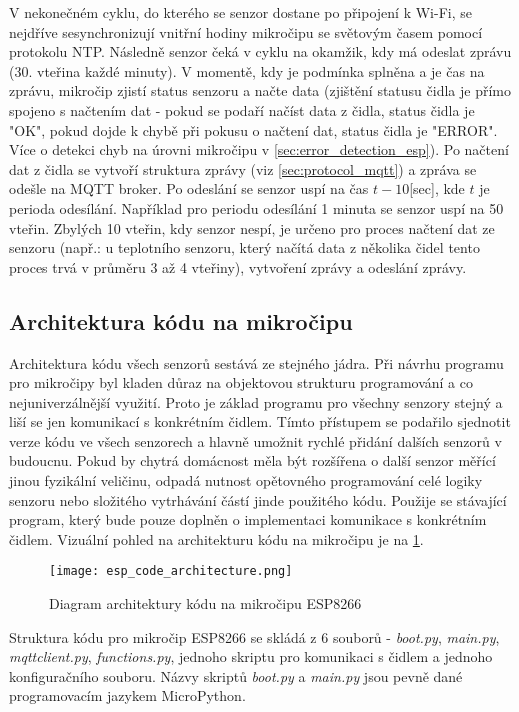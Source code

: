 V nekonečném cyklu, do kterého se senzor dostane po připojení k Wi-Fi, se nejdříve sesynchronizují vnitřní hodiny mikročipu se světovým časem pomocí protokolu NTP. Následně senzor čeká v cyklu na okamžik, kdy má odeslat zprávu (30. vteřina každé minuty). V momentě, kdy je podmínka splněna a je čas na zprávu, mikročip zjistí status senzoru a načte data (zjištění statusu čidla je přímo spojeno s načtením dat - pokud se podaří načíst data z čidla, status čidla je "OK", pokud dojde k chybě při pokusu o načtení dat, status čidla je "ERROR". Více o detekci chyb na úrovni mikročipu v \cref{sec:error_detection_esp}). Po načtení dat z čidla se vytvoří struktura zprávy (viz \cref{sec:protocol_mqtt}) a zpráva se odešle na MQTT broker. Po odeslání se senzor uspí na čas $t-10$[sec], kde $t$ je perioda odesílání. Například pro periodu odesílání 1 minuta se senzor uspí na 50 vteřin. Zbylých 10 vteřin, kdy senzor nespí, je určeno pro proces načtení dat ze senzoru (např.: u teplotního senzoru, který načítá data z několika čidel tento proces trvá v průměru 3 až 4 vteřiny), vytvoření zprávy a odeslání zprávy.

\subsection*{Architektura kódu na mikročipu}
Architektura kódu všech senzorů sestává ze stejného jádra. Při návrhu programu pro mikročipy byl kladen důraz na objektovou strukturu programování a co nejuniverzálnější využití. Proto je základ programu pro všechny senzory stejný a liší se jen komunikací s konkrétním čidlem. Tímto přístupem se podařilo sjednotit verze kódu ve všech senzorech a hlavně umožnit rychlé přidání dalších senzorů v budoucnu. Pokud by chytrá domácnost měla být rozšířena o další senzor měřící jinou fyzikální veličinu, odpadá nutnost opětovného programování celé logiky senzoru nebo složitého vytrhávání částí jinde použitého kódu. Použije se stávající program, který bude pouze doplněn o implementaci komunikace s konkrétním čidlem. Vizuální pohled na architekturu kódu na mikročipu je na \cref{fig:esp_code_architecture}. 

\begin{figure}[H]
  \centering
  \texttt{[image: esp\_code\_architecture.png]}
  \caption{Diagram architektury kódu na mikročipu ESP8266}
  \label{fig:esp_code_architecture}
\end{figure}

\par
Struktura kódu pro mikročip ESP8266 se skládá z 6 souborů - \textit{boot.py}, \textit{main.py}, \textit{mqttclient.py}, \textit{functions.py}, jednoho skriptu pro komunikaci s čidlem a jednoho konfiguračního souboru. Názvy skriptů \textit{boot.py} a \textit{main.py} jsou pevně dané programovacím jazykem MicroPython. 
 
